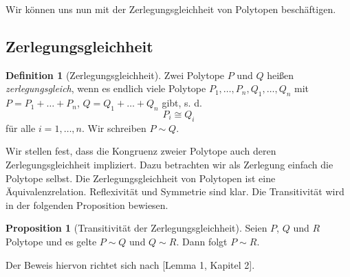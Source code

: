 \documentclass[11pt,titlepage]{article}
\theoremstyle{definition}
\newtheorem{proposition}[theorem]{Proposition}
\newtheorem{definition}[theorem]{Definition}
\theoremstyle{remark}
\begin{document}
	Wir können uns nun mit der Zerlegungsgleichheit von Polytopen beschäftigen.
	
	\subsection{Zerlegungsgleichheit}
	
	\begin{definition}[Zerlegungsgleichheit]
		Zwei Polytope $P$ und $Q$ heißen \textsl{zerlegungsgleich}, wenn es endlich viele Polytope 
		$P_1,\ldots,P_n,Q_1,\ldots,Q_n$ mit $P=P_1 +\ldots +P_n$,  $Q=Q_1 +\ldots+Q_n$ 
		gibt, s. d. 
		\[P_i\cong Q_i\]
		für alle $i=1,\ldots,n$. Wir schreiben $P\sim Q$.
	\end{definition}
	
	Wir stellen fest, dass die Kongruenz zweier Polytope auch deren 
	Zerlegungsgleichheit impliziert. Dazu betrachten wir als Zerlegung einfach 
	die Polytope selbst. Die Zerlegungsgleichheit von Polytopen ist eine 
	Äquivalenzrelation. Reflexivität und Symmetrie sind klar. Die Transitivität 
	wird in der folgenden Proposition bewiesen.
	
	\begin{proposition}[Transitivität der Zerlegungsgleichheit] \label{lemma:transitiv}
		Seien $P$, $Q$ und $R$ Polytope und es gelte $P\sim Q$ und $Q\sim R$. Dann folgt $P\sim R$.
	\end{proposition}
	
	Der Beweis hiervon richtet sich nach \cite{Boltianskii}[Lemma 1, Kapitel 2].
	
\end{document}
